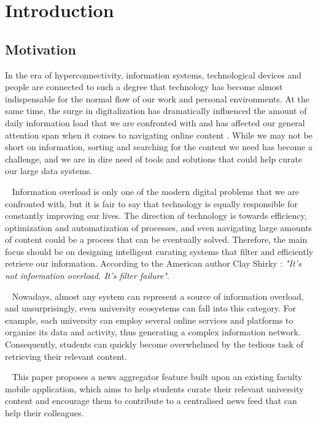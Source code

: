 \chapter{Introduction} \label{chapter1}

\section{Motivation} \label{1:motivation}

In the era of hyperconnectivity, information systems, technological devices and people are connected to such a degree that technology has become almost indispensable for the normal flow of our work and personal environments. At the same time, the surge in digitalization has dramatically influenced the amount of daily information load that we are confronted with and has affected our general attention span when it comes to navigating online content \cite{death-info-overload}. While we may not be short on information, sorting and searching for the content we need has become a challenge, and we are in dire need of tools and solutions that could help curate our large data systems.

~
Information overload \cite{tunikova-info-overload} is only one of the modern digital problems that we are confronted with, but it is fair to say that technology is equally responsible for constantly improving our lives. The direction of technology is towards efficiency, optimization and automatization of processes, and even navigating large amounts of content could be a process that can be eventually solved. Therefore, the main focus should be on designing intelligent curating systems that filter and efficiently retrieve our information. According to the American author Clay Shirky \cite{clayshirky}: \textit{"It's not information overload. It's filter failure"}.

~
Nowadays, almost any system can represent a source of information overload, and unsurprisingly, even university ecosystems can fall into this category. For example, each university can employ several online services and platforms to organize its data and activity, thus generating a complex information network. Consequently, students can quickly become overwhelmed by the tedious task of retrieving their relevant content.

~
This paper proposes a news aggregator feature built upon an existing faculty mobile application, which aims to help students curate their relevant university content and encourage them to contribute to a centralised news feed that can help their colleagues.

